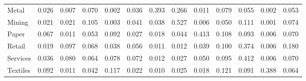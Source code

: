 \begin{table}[htbp]
\begin{tabular}{lcccccccccccc}
  Metal & \textcolor[RGB]{161,104,94}{0.026} & \textcolor[RGB]{225,146,30}{0.007} & \textcolor[RGB]{92,60,163}{0.070} & \textcolor[RGB]{248,160,7}{0.002} & \textcolor[RGB]{145,94,110}{0.036} & \textcolor[RGB]{11,7,244}{0.393} & \textcolor[RGB]{18,11,237}{0.266} & \textcolor[RGB]{207,134,48}{0.011} & \textcolor[RGB]{83,54,172}{0.079} & \textcolor[RGB]{113,73,142}{0.055} & \textcolor[RGB]{243,157,12}{0.002} & \textcolor[RGB]{115,74,140}{0.053} \\ 
  Mining & \textcolor[RGB]{174,112,81}{0.021} & \textcolor[RGB]{175,113,80}{0.021} & \textcolor[RGB]{51,33,204}{0.105} & \textcolor[RGB]{239,155,16}{0.003} & \textcolor[RGB]{136,88,119}{0.041} & \textcolor[RGB]{142,92,113}{0.038} & \textcolor[RGB]{2,1,253}{0.527} & \textcolor[RGB]{228,148,27}{0.006} & \textcolor[RGB]{122,79,133}{0.050} & \textcolor[RGB]{44,29,211}{0.111} & \textcolor[RGB]{251,163,4}{0.001} & \textcolor[RGB]{87,56,168}{0.074} \\ 
  Paper & \textcolor[RGB]{99,64,156}{0.067} & \textcolor[RGB]{202,131,53}{0.011} & \textcolor[RGB]{117,76,138}{0.053} & \textcolor[RGB]{69,45,186}{0.092} & \textcolor[RGB]{159,103,96}{0.027} & \textcolor[RGB]{186,120,69}{0.018} & \textcolor[RGB]{129,84,126}{0.044} & \textcolor[RGB]{7,5,248}{0.413} & \textcolor[RGB]{48,31,207}{0.108} & \textcolor[RGB]{66,42,189}{0.093} & \textcolor[RGB]{232,150,23}{0.006} & \textcolor[RGB]{96,62,159}{0.070} \\ 
  Retail & \textcolor[RGB]{182,118,73}{0.019} & \textcolor[RGB]{58,38,197}{0.097} & \textcolor[RGB]{97,63,158}{0.068} & \textcolor[RGB]{143,93,112}{0.038} & \textcolor[RGB]{112,72,143}{0.056} & \textcolor[RGB]{205,133,50}{0.011} & \textcolor[RGB]{198,128,57}{0.012} & \textcolor[RGB]{138,89,117}{0.039} & \textcolor[RGB]{55,36,200}{0.100} & \textcolor[RGB]{16,10,239}{0.374} & \textcolor[RGB]{227,147,28}{0.006} & \textcolor[RGB]{28,18,227}{0.180} \\ 
  Services & \textcolor[RGB]{147,95,108}{0.036} & \textcolor[RGB]{81,53,174}{0.080} & \textcolor[RGB]{104,68,151}{0.064} & \textcolor[RGB]{85,55,170}{0.078} & \textcolor[RGB]{89,57,166}{0.072} & \textcolor[RGB]{200,129,55}{0.012} & \textcolor[RGB]{158,102,97}{0.027} & \textcolor[RGB]{120,78,135}{0.050} & \textcolor[RGB]{62,40,193}{0.095} & \textcolor[RGB]{9,6,246}{0.412} & \textcolor[RGB]{230,149,25}{0.006} & \textcolor[RGB]{94,61,161}{0.070} \\ 
  Textiles & \textcolor[RGB]{67,44,188}{0.092} & \textcolor[RGB]{211,136,44}{0.011} & \textcolor[RGB]{133,86,122}{0.042} & \textcolor[RGB]{42,27,212}{0.117} & \textcolor[RGB]{172,111,83}{0.022} & \textcolor[RGB]{216,140,39}{0.010} & \textcolor[RGB]{165,107,90}{0.025} & \textcolor[RGB]{184,119,71}{0.018} & \textcolor[RGB]{39,25,216}{0.121} & \textcolor[RGB]{73,47,182}{0.091} & \textcolor[RGB]{12,8,243}{0.388} & \textcolor[RGB]{106,69,149}{0.064} \\ 

\end{tabular}
\end{table}
